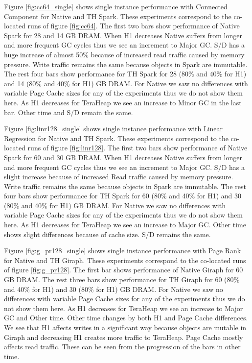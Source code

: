 Figure \ref{fig:cc64_single} shows single instance performance with Connected Component for Native and TH Spark. These experiments correspond to the co-located runs of figure \ref{fig:cc64}. The first two bars show performance of Native Spark for 28 and 14 GB DRAM. When H1 decreases Native suffers from longer and more frequent GC cycles thus we see an increment to Major GC. S/D has a huge increase of almost 50\% because of increased read traffic caused by memory pressure. Write traffic remains the same because objects in Spark are immutable. The rest four bars show performance for TH Spark for 28 (80\% and 40\% for H1) and 14 (80\% and 40\% for H1) GB DRAM. For Native we saw no differences with variable Page Cache sizes for any of the experiments thus we do not show them here. As H1 decreases for TeraHeap we see an increase to Minor GC in the last bar. Other time and S/D remain the same.

Figure \ref{fig:linr128_single} shows single instance performance with Linear Regression for Native and TH Spark. These experiments correspond to the co-located runs of figure \ref{fig:linr128}. The first two bars show performance of Native Spark for 60 and 30 GB DRAM. When H1 decreases Native suffers from longer and more frequent GC cycles thus we see an increment to Major GC. S/D has a slight increase because of increased Read traffic caused by memory pressure. Write traffic remains the same because objects in Spark are immutable. The rest four bars show performance for TH Spark for 60 (80\% and 40\% for H1) and 30 (80\% and 40\% for H1) GB DRAM. For Native we saw no differences with variable Page Cache sizes for any of the experiments thus we do not show them here. As H1 decreases for TeraHeap we see an increase to Major GC. Other time shows slight differences because of cache size. S/D remains the same.

Figure \ref{fig:g_pr128_single} shows single instance performance with Page Rank for Native and TH Giraph. These experiments correspond to the co-located runs of figure \ref{fig:g_pr128}. The first bar shows performance of Native Giraph for 60 GB DRAM. The rest three bars show performance for TH Giraph for 60 (80\% and 40\% for H1) and 30 (80\% for H1) GB DRAM. For Native we saw no differences with variable Page Cache sizes for any of the experiments thus we do not show them here. As H1 decreases for TeraHeap we see an increase to Major GC  and Other time. Other time changes by both H1 and Page Cache differences. We see that H1 affects writes in a significant way because objects are mutable in Giraph and decreasing H1 creates more traffic to TeraHeap. Page Cache mostly affects read traffic. These can be seen from the progression of the bars in other time.

